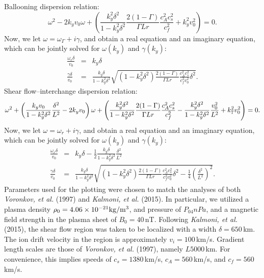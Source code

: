 \documentclass[a4paper,openany,12pt]{book}
\begin{document}
Ballooning dispersion relation:
\begin{equation}
\omega^2-2k_yv_0\omega+\left(\frac{k_y^2\delta^2}{1-k_y^2\delta^2}\frac{2(1-\Gamma)}{\Gamma Lr}\frac{c_A^2c_s^2}{c_f^2}+k_y^2v_0^2\right)=0.\label{E9.118}
\end{equation}
Now, we let $\omega=\omega_\Gamma+i\gamma$, and obtain a real equation and an imaginary equation, which can be jointly solved for $\omega(k_y)$ and $\gamma(k_y)$:
\begin{eqnarray}
\frac{\omega_r\delta}{v_0}&=&k_y\delta\label{E9.119}\\
\frac{\gamma\delta}{v_0}&=&\frac{k_y\delta}{1-k_y^2\delta^2}\sqrt{(1-k_y^2\delta^2)\frac{2(1-\Gamma)}{\Gamma Lr}\frac{c_A^2c_s^2}{c_f^2v_0^2}\delta^2}.\label{E9.120}
\end{eqnarray}
Shear flow--interchange dispersion relation:
\begin{equation}
\omega^2+\left({k_yv_0\over 1-k_y^2\delta^2}{\delta^2\over L^2}-2k_y v_0\right)\omega+\left({k_y^2\delta^2\over 1-k_y^2\delta^2}{2(1-\Gamma)\over \Gamma Lr}{c_A^2c_s^2\over c_f^2}-{k_y^2\delta^2\over 1-k_y^2\delta^2}{v_0^2\over L^2}+k_7^2 v_0^2\right)=0.
\label{E9.121}
\end{equation} 
Now, we let $\omega=\omega_r+i\gamma$, and obtain a real equation and an imaginary equation, which can be jointly solved for $\omega(k_y)$ and $\gamma(k_y)$:
\begin{eqnarray}
\frac{\omega_r\delta}{v_0}&=&k_y\delta-\frac{1}{2}\frac{k_y\delta}{1-k_y^2\delta^2}
\frac{\delta^2}{L^2}\label{E9.122}\\
\frac{\gamma\delta}{v_0}&=&\frac{k_y\delta}{1-k_y^2\delta^2}\sqrt{(1-k_y^2\delta^2)\frac{2(1-\Gamma)}{\Gamma Lr}\frac{c_A^2c_s^2}{c_f^2v_0^2}\delta^2-\frac{1}{4}\left(\frac{\delta^2}{L^2}\right)^2}.\label{E9.123}
\end{eqnarray}
Parameters used for the plotting were chosen to match the analyses of both \emph{Voronkov, et al.} (1997) and \emph{Kalmoni, et al.} (2015). In particular, we utilized a plasma density $\rho_0=4.06\times 10^{-21}\rm kg/m^3$, and pressure of $P_04nPa$, and a magnetic field strength in the plasma sheet of $B_0=40\,$nT. Following \emph{Kalmoni, et al.} (2015), the shear flow region was taken to be localized with a width $\delta=650\,$km. The ion drift velocity in the region is approximately 
$v_i=100\,$km/s. Gradient length scales are those of \emph{Voronkov, et al.} (1997), namely $L5000\,$km. For convenience, this implies speeds of $c_s=1380\,$km/s, $c_A=560\,$km/s, and $c_f=560\,$km/s.
\end{document}
